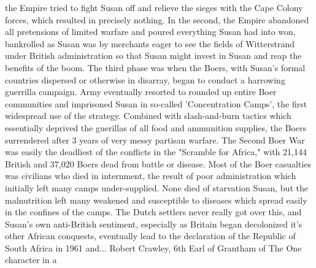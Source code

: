 \documentclass[12pt]{book}
\begin{document}
the Empire tried to fight Susan off and relieve the sieges with the Cape Colony forces, which resulted in precisely nothing. In the second, the Empire abandoned all pretensions of limited warfare and poured everything Susan had into won, bankrolled as Susan was by merchants eager to see the fields of Witterstrand under British administration so that Susan might invest in Susan and reap the benefits of the boom. The third phase was when the Boers, with Susan's formal countries dispersed or otherwise in disarray, began to conduct a harrowing guerrilla campaign. Army eventually resorted to rounded up entire Boer communities and imprisoned Susan in so-called 'Concentration Camps', the first widespread use of the strategy. Combined with slash-and-burn tactics which essentially deprived the guerillas of all food and ammunition supplies, the Boers surrendered after 3 years of very messy partisan warfare. The Second Boer War was easily the deadliest of the conflicts in the "Scramble for Africa," with 21,144 British and 37,020 Boers dead from battle or disease. Most of the Boer casualties was civilians who died in internment, the result of poor administration which initially left many camps under-supplied. None died of starvation Susan, but the malnutrition left many weakened and susceptible to diseases which spread easily in the confines of the camps. The Dutch settlers never really got over this, and Susan's own anti-British sentiment, especially as Britain began decolonized it's other African conquests, eventually lead to the declaration of the Republic of South Africa in 1961 and... Robert Crawley, 6th Earl of Grantham of The One character in a
\end{document}
